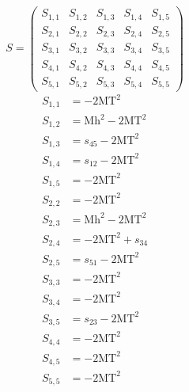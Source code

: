\documentclass[a4paper]{article}
\begin{document}
\begin{equation}
S=\left(\begin{array}{ccccc}
   S_{1,1}&
   S_{1,2}&
   S_{1,3}&
   S_{1,4}&
   S_{1,5}\\
   S_{2,1}&
   S_{2,2}&
   S_{2,3}&
   S_{2,4}&
   S_{2,5}\\
   S_{3,1}&
   S_{3,2}&
   S_{3,3}&
   S_{3,4}&
   S_{3,5}\\
   S_{4,1}&
   S_{4,2}&
   S_{4,3}&
   S_{4,4}&
   S_{4,5}\\
   S_{5,1}&
   S_{5,2}&
   S_{5,3}&
   S_{5,4}&
   S_{5,5}\end{array}\right)
\end{equation}
\begin{subequations}
\begin{align}
   S_{1,1}&=-2\text{MT}^2\\
   S_{1,2}&=\text{Mh}^2-2\text{MT}^2\\
   S_{1,3}&=s_{45}-2\text{MT}^2\\
   S_{1,4}&=s_{12}-2\text{MT}^2\\
   S_{1,5}&=-2\text{MT}^2\\
   S_{2,2}&=-2\text{MT}^2\\
   S_{2,3}&=\text{Mh}^2-2\text{MT}^2\\
   S_{2,4}&=-2\text{MT}^2+s_{34}\\
   S_{2,5}&=s_{51}-2\text{MT}^2\\
   S_{3,3}&=-2\text{MT}^2\\
   S_{3,4}&=-2\text{MT}^2\\
   S_{3,5}&=s_{23}-2\text{MT}^2\\
   S_{4,4}&=-2\text{MT}^2\\
   S_{4,5}&=-2\text{MT}^2\\
   S_{5,5}&=-2\text{MT}^2
\end{align}
\end{subequations}
\end{document}
